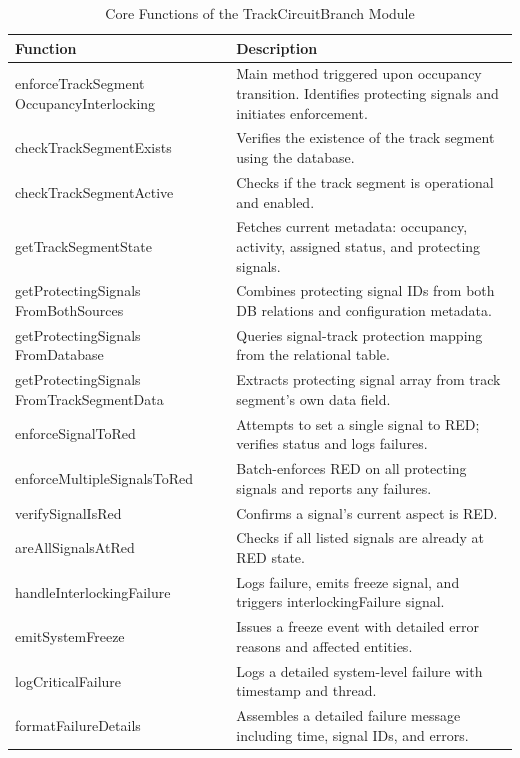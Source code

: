 \begin{table}[H]
    \centering
    \renewcommand{\arraystretch}{1.3}
    \caption{Core Functions of the TrackCircuitBranch Module}
    \begin{tabular}{p{5.2cm} p{10.2cm}}
        \toprule
        \textbf{Function} & \textbf{Description} \\
        \midrule
        enforceTrackSegment \newline OccupancyInterlocking & Main method triggered upon occupancy transition. Identifies protecting signals and initiates enforcement. \\
        checkTrackSegmentExists & Verifies the existence of the track segment using the database. \\
        checkTrackSegmentActive & Checks if the track segment is operational and enabled. \\
        getTrackSegmentState & Fetches current metadata: occupancy, activity, assigned status, and protecting signals. \\
        getProtectingSignals \newline FromBothSources & Combines protecting signal IDs from both DB relations and configuration metadata. \\
        getProtectingSignals \newline FromDatabase & Queries signal-track protection mapping from the relational table. \\
        getProtectingSignals \newline FromTrackSegmentData & Extracts protecting signal array from track segment's own data field. \\
        enforceSignalToRed & Attempts to set a single signal to RED; verifies status and logs failures. \\
        enforceMultipleSignalsToRed & Batch-enforces RED on all protecting signals and reports any failures. \\
        verifySignalIsRed & Confirms a signal's current aspect is RED. \\
        areAllSignalsAtRed & Checks if all listed signals are already at RED state. \\
        handleInterlockingFailure & Logs failure, emits freeze signal, and triggers interlockingFailure signal. \\
        emitSystemFreeze & Issues a freeze event with detailed error reasons and affected entities. \\
        logCriticalFailure & Logs a detailed system-level failure with timestamp and thread. \\
        formatFailureDetails & Assembles a detailed failure message including time, signal IDs, and errors. \\
        \bottomrule
    \end{tabular}
    \label{tab:track-circuit-branch-functions}
\end{table}

